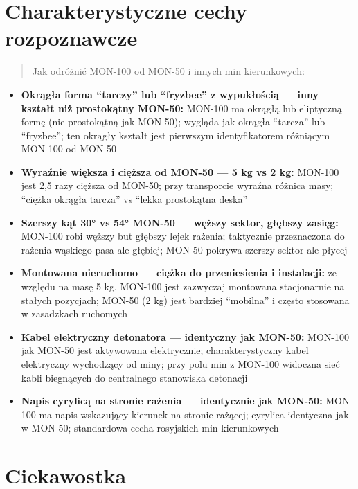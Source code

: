 \documentclass[12pt,openany,oneside]{book}
\providecommand{\tightlist}{%
  \setlength{\itemsep}{0pt}\setlength{\parskip}{0pt}}
\begin{document}
\section{Charakterystyczne cechy
rozpoznawcze}\label{charakterystyczne-cechy-rozpoznawcze-113}

\begin{quote}
Jak odróżnić MON-100 od MON-50 i innych min kierunkowych:
\end{quote}

\begin{itemize}
\tightlist
\item
  \textbf{Okrągła forma ``tarczy'' lub ``fryzbee'' z wypukłością ---
  inny kształt niż prostokątny MON-50:} MON-100 ma okrągłą lub
  eliptyczną formę (nie prostokątną jak MON-50); wygląda jak okrągła
  ``tarcza'' lub ``fryzbee''; ten okrągły kształt jest pierwszym
  identyfikatorem różniącym MON-100 od MON-50
\item
  \textbf{Wyraźnie większa i cięższa od MON-50 --- 5 kg vs 2 kg:}
  MON-100 jest 2,5 razy cięższa od MON-50; przy transporcie wyraźna
  różnica masy; ``ciężka okrągła tarcza'' vs ``lekka prostokątna deska''
\item
  \textbf{Szerszy kąt 30° vs 54° MON-50 --- węższy sektor, głębszy
  zasięg:} MON-100 robi węższy but głębszy lejek rażenia; taktycznie
  przeznaczona do rażenia wąskiego pasa ale głębiej; MON-50 pokrywa
  szerszy sektor ale płycej
\item
  \textbf{Montowana nieruchomo --- ciężka do przeniesienia i
  instalacji:} ze względu na masę 5 kg, MON-100 jest zazwyczaj montowana
  stacjonarnie na stałych pozycjach; MON-50 (2 kg) jest bardziej
  ``mobilna'' i często stosowana w zasadzkach ruchomych
\item
  \textbf{Kabel elektryczny detonatora --- identyczny jak MON-50:}
  MON-100 jak MON-50 jest aktywowana elektrycznie; charakterystyczny
  kabel elektryczny wychodzący od miny; przy polu min z MON-100 widoczna
  sieć kabli biegnących do centralnego stanowiska detonacji
\item
  \textbf{Napis cyrylicą na stronie rażenia --- identycznie jak MON-50:}
  MON-100 ma napis wskazujący kierunek na stronie rażącej; cyrylica
  identyczna jak w MON-50; standardowa cecha rosyjskich min kierunkowych
\end{itemize}

\section{Ciekawostka}\label{ciekawostka-113}
\end{document}
